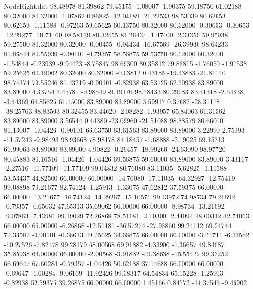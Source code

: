 \begin{filecontents}{NodeRight.dat}
  98.48978   81.39862   79.45175    -1.08007   -1.90375   59.18750   61.02188   80.32000   80.32000   -1.07862    0.86825  -12.04189  -21.22533
  98.53039   80.62653   80.62653    -1.11588   -0.97263   59.65625   60.13750   80.32000   80.32000   -0.30653   -0.30653  -12.29277  -10.71469
  98.58139   80.32455   81.26434    -1.47400   -2.33350   59.95938   59.27500   80.32000   80.32000   -0.00455   -0.94434  -16.67569  -26.39936
  98.64233   81.86844   80.55939    -0.90101   -0.79357   58.56875   59.53750   80.32000   80.32000   -1.54844   -0.23939   -9.94423   -8.75847
  98.69300   80.35812   79.88815    -1.76050   -1.97538   59.25625   60.19062   80.32000   80.32000   -0.03812    0.43185  -19.43883  -21.81140
  98.74374   79.55246   81.43219    -0.90101   -0.82938   63.53125   62.30938   83.89000   83.89000    4.33754    2.45781   -9.98549   -9.19170
  98.78433   80.29083   83.51318    -2.54838   -3.44369   64.85625   61.45000   83.89000   83.89000    3.59917    0.37682  -28.31118  -38.25763
  98.83503   80.32455   83.44620    -2.08282   -1.93957   65.84063   61.31562   83.89000   83.89000    3.56544    0.44380  -23.09960  -21.51088
  98.88579   80.66010   81.13007    -1.04426   -0.90101   66.63750   63.61563   83.89000   83.89000    3.22990    2.75993  -11.57243   -9.98493
  98.93668   78.98178   84.18457    -1.68888   -2.19025   69.15313   61.99063   83.89000   83.89000    4.90822   -0.29457  -18.99260  -24.63090
  98.97720   80.45883   86.16516    -1.04426   -1.04426   69.56875   59.60000   83.89000   83.89000    3.43117   -2.27516  -11.77109  -11.77109
  99.04832   80.76080   83.11035    -5.62825   -1.11588   53.53437   44.82500   66.00000   66.00000  -14.76080  -17.11035  -64.32927  -12.75419
  99.08898   79.21677   82.74124    -1.25913   -1.33075   47.62812   37.59375   66.00000   66.00000  -13.21677  -16.74124  -14.29267  -15.10571
  99.13972   74.98734   79.21692    -0.79357   -0.65032   47.65313   35.69062   66.00000   66.00000   -8.98734  -13.21692   -9.07863   -7.43981
  99.19029   72.26868   78.51181    -3.19300   -2.44094   48.00312   32.74063   66.00000   66.00000   -6.26868  -12.51181  -36.57274  -27.95860
  99.24112   69.24744   72.33582    -0.90101   -0.68613   49.25625   34.66875   66.00000   66.00000   -3.24744   -6.33582  -10.27526   -7.82478
  99.28179   68.00568   69.91882    -4.33900   -1.36657   49.84687   35.85938   66.00000   66.00000   -2.00568   -3.91882  -49.38638  -15.55422
  99.33252   66.69647   67.60284    -0.79357   -1.04426   50.62188   37.14688   66.00000   66.00000   -0.69647   -1.60284   -9.06169  -11.92426
  99.38317   64.54834   65.15228    -1.25913   -0.82938   52.59375   39.26875   66.00000   66.00000    1.45166    0.84772  -14.37546   -9.46902

\end{filecontents}

